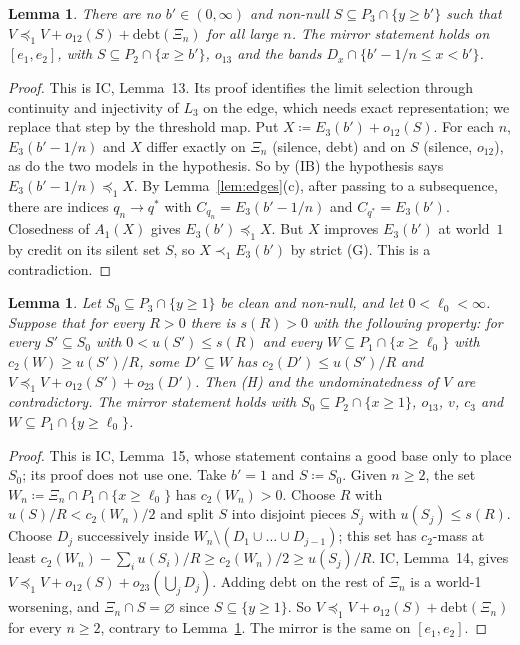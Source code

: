 \documentclass[11pt]{article}
\newtheorem{lemma}[theorem]{Lemma}
\theoremstyle{definition}\newtheorem{definition}[theorem]{Definition}
\theoremstyle{remark}\newtheorem{remark}[theorem]{Remark}
\newcommand{\debt}{\mathrm{debt}}
\newcommand{\Band}{\Xi}
\begin{document}
\begin{lemma}\label{lem:closing}
There are no $b'\in(0,\infty)$ and non-null $S\subseteq P_3\cap\{y\ge b'\}$
such that $V\preceq_1V+o_{12}(S)+\debt(\Band_n)$ for all large $n$. The mirror
statement holds on $[e_1,e_2]$, with $S\subseteq P_2\cap\{x\ge b'\}$, $o_{13}$
and the bands $D_x\cap\{b'-1/n\le x<b'\}$.
\end{lemma}
\begin{proof}
This is IC, Lemma~13. Its proof identifies the limit selection through
continuity and injectivity of $L_3$ on the edge, which needs exact
representation; we replace that step by the threshold map. Put
$X\coloneqq E_3(b')+o_{12}(S)$. For each $n$, $E_3(b'-1/n)$ and $X$ differ
exactly on $\Band_n$ (silence, debt) and on $S$ (silence, $o_{12}$), as do the
two models in the hypothesis. So by (IB) the hypothesis says
$E_3(b'-1/n)\preceq_1X$. By Lemma~\ref{lem:edges}(c), after passing to a
subsequence, there are indices $q_n\to q^*$ with $C_{q_n}=E_3(b'-1/n)$ and $C_{q^*}=E_3(b')$. Closedness of
$A_1(X)$ gives $E_3(b')\preceq_1X$. But $X$ improves $E_3(b')$ at world~$1$ by
credit on its silent set $S$, so $X\prec_1E_3(b')$ by strict (G). This is a
contradiction.
\end{proof}

\begin{lemma}\label{lem:ratio}
Let $S_0\subseteq P_3\cap\{y\ge1\}$ be clean and non-null, and let
$0<\ell_0<\infty$. Suppose that for every $R>0$ there is $s(R)>0$ with the
following property: for every $S'\subseteq S_0$ with $0<u(S')\le s(R)$ and
every $W\subseteq P_1\cap\{x\ge\ell_0\}$ with $c_2(W)\ge u(S')/R$, some
$D'\subseteq W$ has $c_2(D')\le u(S')/R$ and
$V\preceq_1V+o_{12}(S')+o_{23}(D')$. Then (H) and the undominatedness of $V$
are contradictory. The mirror statement holds with $S_0\subseteq P_2\cap\{x\ge
1\}$, $o_{13}$, $v$, $c_3$ and $W\subseteq P_1\cap\{y\ge\ell_0\}$.
\end{lemma}
\begin{proof}
This is IC, Lemma~15, whose statement contains a good base only to place
$S_0$; its proof does not use one. Take $b'=1$ and $S\coloneqq S_0$. Given
$n\ge2$, the set $W_n\coloneqq\Band_n\cap P_1\cap\{x\ge\ell_0\}$ has
$c_2(W_n)>0$. Choose $R$ with $u(S)/R<c_2(W_n)/2$ and split $S$ into disjoint
pieces $S_j$ with $u(S_j)\le s(R)$. Choose $D_j$ successively inside
$W_n\setminus(D_1\cup\dots\cup D_{j-1})$; this set has $c_2$-mass at least
$c_2(W_n)-\sum_iu(S_i)/R\ge c_2(W_n)/2\ge u(S_j)/R$. IC, Lemma~14, gives
$V\preceq_1V+o_{12}(S)+o_{23}(\bigcup_jD_j)$. Adding debt on the rest of
$\Band_n$ is a world-1 worsening, and $\Band_n\cap S=\varnothing$ since
$S\subseteq\{y\ge1\}$. So $V\preceq_1V+o_{12}(S)+\debt(\Band_n)$ for every
$n\ge2$, contrary to Lemma~\ref{lem:closing}. The mirror is the same on
$[e_1,e_2]$.
\end{proof}
\end{document}
